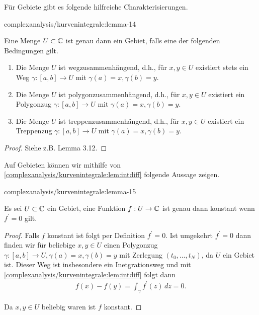 \par
Für Gebiete gibt es folgende hilfreiche Charakterisierungen.
\begin{lemma}{}{complexanalysis/kurvenintegrale:lemma-14}



\par
Eine Menge \(U\subset\mathbb{C}\) ist genau dann ein Gebiet, falls eine der folgenden Bedingungen gilt.
\begin{enumerate}

\item {} 
\par
Die Menge \(U\) ist wegzusammenhängend, d.h., für \(x,y\in U\) existiert stets ein Weg \(\gamma:[a,b]\to U\) mit \(\gamma(a)=x,\gamma(b)=y\).

\item {} 
\par
Die Menge \(U\) ist polygonzusammenhängend, d.h., für \(x,y\in U\) existiert ein Polygonzug \(\gamma:[a,b]\to U\) mit \(\gamma(a)=x,\gamma(b)=y\).

\item {} 
\par
Die Menge \(U\) ist treppenzusammenhängend, d.h., für \(x,y\in U\) existiert ein Treppenzug \(\gamma:[a,b]\to U\) mit \(\gamma(a)=x,\gamma(b)=y\).

\end{enumerate}
\end{lemma}

\begin{proof}
 Siehe z.B. \cite{Nee17} Lemma 3.12.
\end{proof}

\par
Auf Gebieten können wir mithilfe von \cref{complexanalysis/kurvenintegrale:lem:intdiff} folgende Aussage zeigen.
\begin{lemma}{}{complexanalysis/kurvenintegrale:lemma-15}



\par
Es sei \(U\subset\mathbb{C}\) ein Gebiet, eine Funktion \(f:U\to\mathbb{C}\) ist genau dann konstant wenn \(f^\prime=0\) gilt.
\end{lemma}

\begin{proof}
 Falls \(f\) konstant ist folgt per Definition \(f^\prime=0\). Ist umgekehrt \(f^\prime=0\) dann finden wir für beliebige \(x,y\in U\) einen Polygonzug \(\gamma:[a,b]\to U, \gamma(a)=x,\gamma(b)=y\) mit Zerlegung \((t_0,\ldots,t_N)\), da \(U\) ein Gebiet ist. Dieser Weg ist insbesondere ein Inetgrationsweg und mit \cref{complexanalysis/kurvenintegrale:lem:intdiff} folgt dann
\begin{align*}
f(x) - f(y) = \int_\gamma f^\prime(z)\, dz = 0.
\end{align*}
\par
Da \(x,y\in U\) beliebig waren ist \(f\) konstant.
\end{proof}

